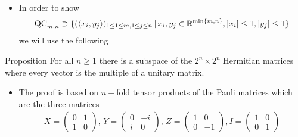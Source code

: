 \begin{frame}
	\begin{itemize}
		\item  In order to show 
		\begin{align*} \textup{QC}_{m,n} \supset \{ (\langle x_i,y_j \rangle)_{1 \le 1 \le m, 1 \le j \le n} \,| \, x_i,y_j \in 				\mathbb{R}^{ \min \{m,n \} }, \vert x_i  \vert \le 1, \vert y_j \vert \le 1  \} 
		\end{align*}  we will use the following 
	\end{itemize}
	
	\begin{block}{Proposition}
		For all $ n \ge 1 $ there is a subspace of the $ 2^n \times 2^n $ Hermitian matrices where every vector is the multiple of a unitary matrix. 
	\end{block}
	\begin{itemize}
		\item The proof is based on $ n- $fold tensor products of the Pauli matrices which are the three matrices 
		\begin{align*}
		X = \begin{pmatrix}
		0 & 1 \\ 1 & 0
		\end{pmatrix}, \, Y = \begin{pmatrix}
		0 & -i \\ i & 0
		\end{pmatrix}, \, Z = \begin{pmatrix}
		1 & 0 \\ 0 & -1
		\end{pmatrix}, I = \begin{pmatrix}
		1 & 0 \\ 0 & 1
		\end{pmatrix}
		\end{align*}
	\end{itemize}
\end{frame}

